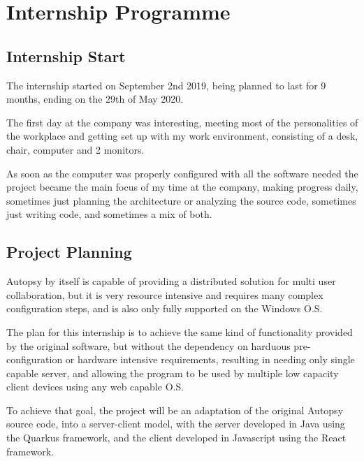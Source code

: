 

\chapter{Internship Programme}
\label{ch:desenvolvimento}

\section{Internship Start}

The internship started on September 2nd 2019, being planned to last for 9 months, ending on the 29th of May 2020.

The first day at the company was interesting, meeting most of the personalities of the workplace and getting set up with my work environment,
consisting of a desk, chair, computer and 2 monitors.

As soon as the computer was properly configured with all the software needed the project became the main focus of my time at the company,
making progress daily, sometimes just planning the architecture or analyzing the source code, sometimes just writing code, and sometimes a mix of both.

\section{Project Planning}

Autopsy by itself is capable of providing a distributed solution for multi user collaboration, but it is very resource intensive and requires many complex configuration steps,
and is also only fully supported on the Windows O.S.

The plan for this internship is to achieve the same kind of functionality provided by the original software, but without the dependency on harduous pre-configuration
or hardware intensive requirements, resulting in needing only single capable server, and allowing the program to be used by multiple low capacity client devices using 
any web capable O.S.

To achieve that goal, the project will be an adaptation of the original Autopsy source code, into a server-client model, with the server developed in Java using the Quarkus framework,
and the client developed in Javascript using the React framework.

